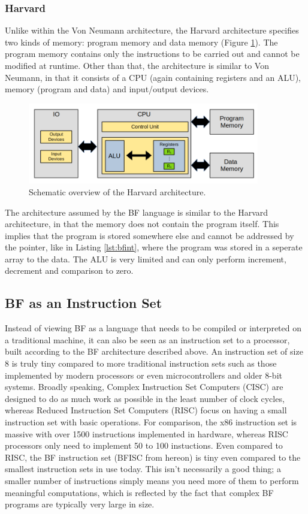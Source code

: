 \subsubsection{Harvard}
Unlike within the Von Neumann architecture, the Harvard architecture specifies two kinds of memory: program memory and data memory (Figure \ref{fig:harvard}). The program memory contains only the instructions to be carried out and cannot be modified at runtime. Other than that, the architecture is similar to Von Neumann, in that it consists of a CPU (again containing registers and an ALU), memory (program and data) and input/output devices.
\begin{figure}[H]
  \centering
  \includegraphics[width=0.9\textwidth]{img/harvard}
  \caption{Schematic overview of the Harvard architecture.}
  \label{fig:harvard}
\end{figure}

The architecture assumed by the BF language is similar to the Harvard architecture, in that the memory does not contain the program itself. This implies that the program is stored somewhere else and cannot be addressed by the pointer, like in Listing \ref{lst:bfint}, where the program was stored in a seperate array to the data. The ALU is very limited and can only perform increment, decrement and comparison to zero.


\subsection{BF as an Instruction Set}
Instead of viewing BF as a language that needs to be compiled or interpreted on a traditional machine, it can also be seen as an instruction set to a processor, built according to the BF architecture described above. An instruction set of size 8 is truly tiny compared to more traditional instruction sets such as those implemented by modern processors or even microcontrollers and older 8-bit systems. Broadly speaking, Complex Instruction Set Computers (CISC) are designed to do as much work as possible in the least number of clock cycles, whereas Reduced Instruction Set Computers (RISC) focus on having a small instruction set with basic operations. For comparison, the x86 instruction set is massive with over 1500 instructions implemented in hardware, whereas RISC processors only need to implement 50 to 100 instuctions. Even compared to RISC, the BF instruction set (BFISC from hereon) is tiny even compared to the smallest instruction sets in use today. This isn't necessarily a good thing; a smaller number of instructions simply means you need more of them to perform meaningful computations, which is reflected by the fact that complex BF programs are typically very large in size.

